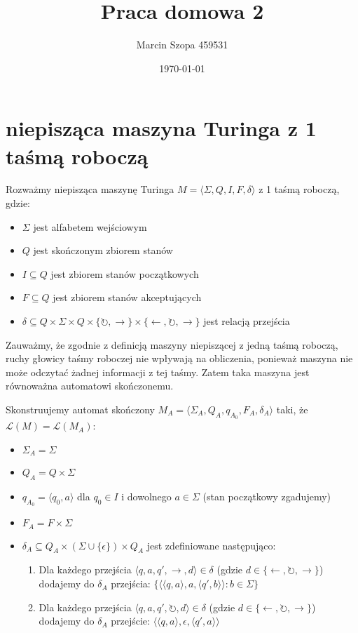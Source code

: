 \documentclass{article}
\title{Praca domowa 2}
\author{Marcin Szopa 459531}
\date{\today}
\theoremstyle{definition}
\theoremstyle{remark}
\begin{document}
\maketitle

\section{niepisząca maszyna Turinga z 1 taśmą roboczą}

Rozważmy niepisząca maszynę Turinga $M = \langle \Sigma, Q, I, F, \delta \rangle$ z 1 taśmą roboczą, gdzie:
\begin{itemize}
\item $\Sigma$ jest alfabetem wejściowym
\item $Q$ jest skończonym zbiorem stanów
\item $I \subseteq Q$ jest zbiorem stanów początkowych
\item $F \subseteq Q$ jest zbiorem stanów akceptujących
\item $\delta \subseteq Q \times \Sigma \times Q \times \{\circlearrowright, \rightarrow\} \times \{\leftarrow, \circlearrowright, \rightarrow\}$ jest relacją przejścia
\end{itemize}

Zauważmy, że zgodnie z definicją maszyny niepiszącej z jedną taśmą roboczą, ruchy głowicy taśmy roboczej nie wpływają na obliczenia, ponieważ maszyna nie może odczytać żadnej informacji z tej taśmy. Zatem taka maszyna jest równoważna automatowi skończonemu.

Skonstruujemy automat skończony $M_A = \langle \Sigma_A, Q_A, q_{A_0}, F_A, \delta_A \rangle$ taki, że $\mathcal{L}(M) = \mathcal{L}(M_A)$:

\begin{itemize}
\item $\Sigma_A = \Sigma$
\item $Q_A = Q \times \Sigma$ 
\item $q_{A_0} = \langle q_0, a \rangle$ dla $q_0 \in I$ i dowolnego $a \in \Sigma$ (stan początkowy zgadujemy)
\item $F_A = F \times \Sigma$
\item $\delta_A \subseteq Q_A \times (\Sigma \cup \{\epsilon\}) \times Q_A$ jest zdefiniowane następująco:
\begin{enumerate}
    \item Dla każdego przejścia $\langle q, a, q', \rightarrow, d \rangle \in \delta$ (gdzie $d \in \{\leftarrow, \circlearrowright, \rightarrow\}$) dodajemy do $\delta_A$ przejścia: 
    $\{\langle \langle q,a \rangle, a, \langle q',b \rangle \rangle : b \in \Sigma\}$
    
    \item Dla każdego przejścia $\langle q, a, q', \circlearrowright, d \rangle \in \delta$ (gdzie $d \in \{\leftarrow, \circlearrowright, \rightarrow\}$) dodajemy do $\delta_A$ przejście:
    $\langle \langle q,a \rangle, \epsilon, \langle q',a \rangle \rangle$
\end{enumerate}
\end{itemize}
\end{document}
